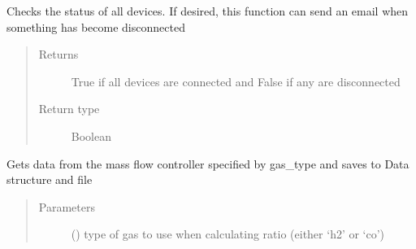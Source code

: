 \documentclass[letterpaper,10pt,english]{sphinxmanual}
\begin{document}
\begin{fulllineitems}
\begin{fulllineitems}
%
\begin{sphinxVerbatim}[commandchars=\\\{\}]
 
  
   
\end{sphinxVerbatim}

\end{fulllineitems}


\begin{fulllineitems}
\label{\detokenize{laboratory:laboratory.Setup.device_status}}
Checks the status of all devices. If desired, this function can send an email when something has become disconnected
\begin{quote}\begin{description}
\item[{Returns}] \leavevmode
True if all devices are connected and False if any are disconnected

\item[{Return type}] \leavevmode
Boolean

\end{description}\end{quote}

\end{fulllineitems}


\begin{fulllineitems}
\label{\detokenize{laboratory:laboratory.Setup.get_gas}}
Gets data from the mass flow controller specified by gas\_type and saves to Data structure and file
\begin{quote}\begin{description}
\item[{Parameters}] \leavevmode
{} () \textendash{} type of gas to use when calculating ratio (either ‘h2’ or ‘co’)


\end{description}
\end{quote}
\end{fulllineitems}
\end{fulllineitems}
\end{document}
